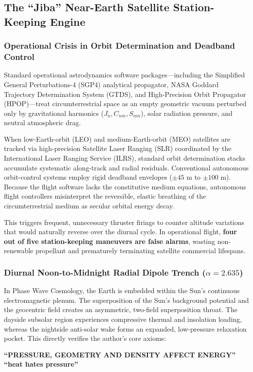 \documentclass[11pt,a4paper]{article}
\begin{document}
\subsection{The ``Jiba'' Near-Earth Satellite Station-Keeping Engine}
\label{subsec:jiba_engine}

\subsubsection{Operational Crisis in Orbit Determination and Deadband Control}
\label{subsubsec:jiba_crisis}

Standard operational astrodynamics software packages---including the Simplified General Perturbations-4 (SGP4) analytical propagator, NASA Goddard Trajectory Determination System (GTDS), and High-Precision Orbit Propagator (HPOP)---treat circumterrestrial space as an empty geometric vacuum perturbed only by gravitational harmonics ($J_n, C_{nm}, S_{nm}$), solar radiation pressure, and neutral atmospheric drag.

When low-Earth-orbit (LEO) and medium-Earth-orbit (MEO) satellites are tracked via high-precision Satellite Laser Ranging (SLR) coordinated by the International Laser Ranging Service (ILRS), standard orbit determination stacks accumulate systematic along-track and radial residuals. Conventional autonomous orbit-control systems employ rigid deadband envelopes ($\pm 45\text{ m}$ to $\pm 100\text{ m}$). Because the flight software lacks the constitutive medium equations, autonomous flight controllers misinterpret the reversible, elastic breathing of the circumterrestrial medium as secular orbital energy decay.

This triggers frequent, unnecessary thruster firings to counter altitude variations that would naturally reverse over the diurnal cycle. In operational flight, \textbf{four out of five station-keeping maneuvers are false alarms}, wasting non-renewable propellant and prematurely terminating satellite commercial lifespans.

\subsubsection{Diurnal Noon-to-Midnight Radial Dipole Trench ($\alpha = 2.635$)}
\label{subsubsec:dipole_trench}

In Phase Wave Cosmology, the Earth is embedded within the Sun's continuous electromagnetic plenum. The superposition of the Sun's background potential and the geocentric field creates an asymmetric, two-field superposition throat. The dayside subsolar region experiences compressive thermal and insolation loading, whereas the nightside anti-solar wake forms an expanded, low-pressure relaxation pocket. This directly verifies the author's core axioms:
\begin{center}
\textbf{``PRESSURE, GEOMETRY AND DENSITY AFFECT ENERGY''}\\[0.3em]
\textbf{``heat hates pressure''}
\end{center}
\end{document}
